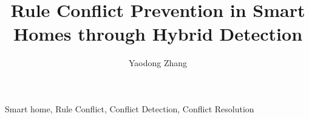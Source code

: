 \documentclass[10pt,journal,compsoc,twoside]{IEEEtran}
\begin{document}
\title{Rule Conflict Prevention in Smart Homes through Hybrid Detection}

\author{Yaodong Zhang\\
}

\maketitle



\begin{IEEEkeywords}
Smart home, Rule Conflict, Conflict Detection, Conflict Resolution 
\end{IEEEkeywords}





%






\end{document}
